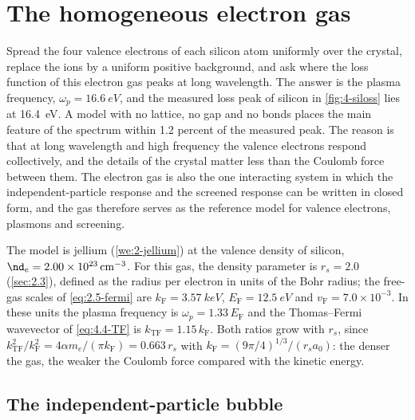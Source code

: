 \section{The homogeneous electron gas}\label{sec:4.5}

Spread the four valence electrons of each silicon atom uniformly over the crystal, replace the ions by a uniform positive background, and ask where the loss function of this electron gas peaks at long wavelength. The answer is the plasma frequency, $\omega_p = \SI{16.6}{eV}$, and the measured loss peak of silicon in \cref{fig:4-siloss} lies at \SI{16.4}{eV}. A model with no lattice, no gap and no bonds places the main feature of the spectrum within 1.2 percent of the measured peak. The reason is that at long wavelength and high frequency the valence electrons respond collectively, and the details of the crystal matter less than the Coulomb force between them. The electron gas is also the one interacting system in which the independent-particle response and the screened response can be written in closed form, and the gas therefore serves as the reference model for valence electrons, plasmons and screening.

The model is jellium (\cref{we:2-jellium}) at the valence density of silicon, $\nd_e = \SI{2.00e23}{cm^{-3}}$. For this gas, the density parameter is $r_s = 2.0$ (\cref{sec:2.3}), defined as the radius per electron in units of the Bohr radius; the free-gas scales of \cref{eq:2.5-fermi} are $k_{\mathrm{F}} = \SI{3.57}{keV}$, $E_{\mathrm{F}} = \SI{12.5}{eV}$ and $v_{\mathrm{F}} = 7.0\times10^{-3}$. In these units the plasma frequency is $\omega_p = 1.33\,E_{\mathrm{F}}$ and the Thomas--Fermi wavevector of \cref{eq:4.4-TF} is $k_{\mathrm{TF}} = 1.15\,k_{\mathrm{F}}$. Both ratios grow with $r_s$, since $k_{\mathrm{TF}}^2/k_{\mathrm{F}}^2 = 4\alpha m_e/(\pi k_{\mathrm{F}}) = 0.663\,r_s$ with $k_{\mathrm{F}} = (9\pi/4)^{1/3}/(r_sa_0)$: the denser the gas, the weaker the Coulomb force compared with the kinetic energy.

\subsection{The independent-particle bubble}

